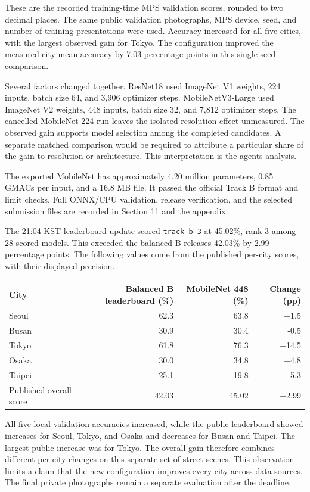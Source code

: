 \documentclass[11pt]{article}
\begin{document}
These are the recorded training-time MPS validation scores, rounded to two
decimal places. The same public validation photographs, MPS device, seed,
and number of training presentations were used. Accuracy increased for all
five cities, with the largest observed gain for Tokyo. The configuration
improved the measured city-mean accuracy by 7.03 percentage points in this
single-seed comparison.

Several factors changed together. ResNet18 used ImageNet V1 weights,
224 inputs, batch size 64, and 3,906 optimizer steps. MobileNetV3-Large
used ImageNet V2 weights, 448 inputs, batch size 32, and 7,812 optimizer
steps. The cancelled MobileNet 224 run leaves the
isolated resolution effect unmeasured. The observed gain supports model
selection among the completed candidates. A separate matched comparison
would be required to attribute a particular share of the gain to resolution
or architecture. This interpretation is the agent\textquotesingle{}s analysis.

The exported MobileNet has approximately 4.20 million parameters,
0.85 GMACs per input, and a 16.8 MB file. It passed the official Track B
format and limit checks. Full ONNX/CPU validation, release verification,
and the selected submission files are recorded in Section 11 and the
appendix.

The 21:04 KST leaderboard update scored \texttt{track-b-3} at 45.02\%,
rank 3 among 28 scored models. This exceeded the balanced B release\textquotesingle{}s
42.03\% by 2.99 percentage points. The following values come from the
published per-city scores, with their displayed precision.

\begin{center}\small
\begin{tabular}{lrrr}
\toprule
City & Balanced B leaderboard (\%) & MobileNet 448 (\%) & Change (pp) \\
\midrule
Seoul & 62.3 & 63.8 & +1.5 \\
Busan & 30.9 & 30.4 & -0.5 \\
Tokyo & 61.8 & 76.3 & +14.5 \\
Osaka & 30.0 & 34.8 & +4.8 \\
Taipei & 25.1 & 19.8 & -5.3 \\
\midrule
Published overall score & 42.03 & 45.02 & +2.99 \\
\bottomrule
\end{tabular}
\end{center}

All five local validation accuracies increased, while the public
leaderboard showed increases for Seoul, Tokyo, and Osaka and decreases for
Busan and Taipei. The largest public increase was for Tokyo. The overall
gain therefore combines different per-city changes on this separate set
of street scenes. This observation limits a claim that the new configuration
improves every city across data sources. The final private photographs
remain a separate evaluation after the deadline.
\end{document}
